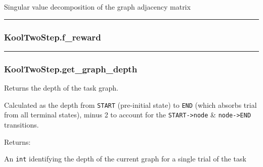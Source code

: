 \begin{Shaded}
\begin{Highlighting}[]
\NormalTok{)}
\end{Highlighting}
\end{Shaded}

Singular value decomposition of the graph adjacency matrix

\begin{center}\rule{0.5\linewidth}{\linethickness}\end{center}

\subsubsection{KoolTwoStep.f\_reward}\label{kooltwostep.f_reward}

\begin{Shaded}
\begin{Highlighting}[]
\end{Highlighting}
\end{Shaded}

\begin{center}\rule{0.5\linewidth}{\linethickness}\end{center}

\subsubsection{KoolTwoStep.get\_graph\_depth}\label{kooltwostep.get_graph_depth}

\begin{Shaded}
\begin{Highlighting}[]
\NormalTok{)}
\end{Highlighting}
\end{Shaded}

Returns the depth of the task graph.

Calculated as the depth from \texttt{START} (pre-initial state) to
\texttt{END} (which absorbs trial from all terminal states), minus 2 to
account for the \texttt{START-\textgreater{}node} \&
\texttt{node-\textgreater{}END} transitions.

Returns:

An \texttt{int} identifying the depth of the current graph for a single
trial of the task

